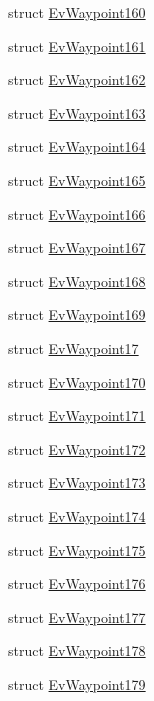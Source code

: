 \begin{DoxyCompactItemize}
struct \hyperlink{structcl__move__base__z_1_1EvWaypoint160}{Ev\+Waypoint160}
\item 
struct \hyperlink{structcl__move__base__z_1_1EvWaypoint161}{Ev\+Waypoint161}
\item 
struct \hyperlink{structcl__move__base__z_1_1EvWaypoint162}{Ev\+Waypoint162}
\item 
struct \hyperlink{structcl__move__base__z_1_1EvWaypoint163}{Ev\+Waypoint163}
\item 
struct \hyperlink{structcl__move__base__z_1_1EvWaypoint164}{Ev\+Waypoint164}
\item 
struct \hyperlink{structcl__move__base__z_1_1EvWaypoint165}{Ev\+Waypoint165}
\item 
struct \hyperlink{structcl__move__base__z_1_1EvWaypoint166}{Ev\+Waypoint166}
\item 
struct \hyperlink{structcl__move__base__z_1_1EvWaypoint167}{Ev\+Waypoint167}
\item 
struct \hyperlink{structcl__move__base__z_1_1EvWaypoint168}{Ev\+Waypoint168}
\item 
struct \hyperlink{structcl__move__base__z_1_1EvWaypoint169}{Ev\+Waypoint169}
\item 
struct \hyperlink{structcl__move__base__z_1_1EvWaypoint17}{Ev\+Waypoint17}
\item 
struct \hyperlink{structcl__move__base__z_1_1EvWaypoint170}{Ev\+Waypoint170}
\item 
struct \hyperlink{structcl__move__base__z_1_1EvWaypoint171}{Ev\+Waypoint171}
\item 
struct \hyperlink{structcl__move__base__z_1_1EvWaypoint172}{Ev\+Waypoint172}
\item 
struct \hyperlink{structcl__move__base__z_1_1EvWaypoint173}{Ev\+Waypoint173}
\item 
struct \hyperlink{structcl__move__base__z_1_1EvWaypoint174}{Ev\+Waypoint174}
\item 
struct \hyperlink{structcl__move__base__z_1_1EvWaypoint175}{Ev\+Waypoint175}
\item 
struct \hyperlink{structcl__move__base__z_1_1EvWaypoint176}{Ev\+Waypoint176}
\item 
struct \hyperlink{structcl__move__base__z_1_1EvWaypoint177}{Ev\+Waypoint177}
\item 
struct \hyperlink{structcl__move__base__z_1_1EvWaypoint178}{Ev\+Waypoint178}
\item 
struct \hyperlink{structcl__move__base__z_1_1EvWaypoint179}{Ev\+Waypoint179}
\item 

\end{DoxyCompactItemize}
